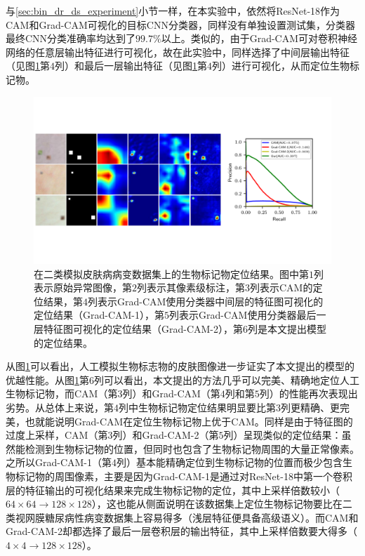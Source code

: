 与\ref{sec:bin_dr_ds_experiment}小节一样，在本实验中，依然将ResNet-18作为CAM和Grad-CAM可视化的目标CNN分类器，同样没有单独设置测试集，分类器最终CNN分类准确率均达到了$99.7\%$以上。类似的，由于Grad-CAM可对卷积神经网络的任意层输出特征进行可视化，故在此实验中，同样选择了中间层输出特征（见图\ref{fig:simulated_skin}第$4$列）和最后一层输出特征（见图\ref{fig:simulated_skin}第$4$列）进行可视化，从而定位生物标记物。
\begin{figure}[h]
	\centering
	\includegraphics[width=1.0\textwidth]{figure/pr_curve_skin_image.pdf}
	\caption{在二类模拟皮肤病病变数据集上的生物标记物定位结果。图中第$1$列表示原始异常图像，第$2$列表示其像素级标注，第$3$列表示CAM的定位结果，第$4$列表示Grad-CAM使用分类器中间层的特征图可视化的定位结果（Grad-CAM-1），第$5$列表示Grad-CAM使用分类器最后一层特征图可视化的定位结果（Grad-CAM-2），第$6$列是本文提出模型的定位结果。} 
	\label{fig:simulated_skin}
\end{figure}

\noindent 从图\ref{fig:simulated_skin}可以看出，人工模拟生物标志物的皮肤图像进一步证实了本文提出的模型的优越性能。从图\ref{fig:simulated_skin}第$6$列可以看出，本文提出的方法几乎可以完美、精确地定位人工生物标记物，而CAM（第$3$列）和Grad-CAM（第$4$列和第$5$列）的性能再次表现出劣势。从总体上来说，第$4$列中生物标记物定位结果明显要比第$3$列更精确、更完美，也就能说明Grad-CAM在定位生物标记物上优于CAM。同样是由于特征图的过度上采样，CAM（第$3$列）和Grad-CAM-2（第$5$列）呈现类似的定位结果：虽然能检测到生物标记物的位置，但同时也包含了生物标记物周围的大量正常像素。之所以Grad-CAM-1（第$4$列）基本能精确定位到生物标记物的位置而极少包含生物标记物的周围像素，主要是因为Grad-CAM-1是通过对ResNet-18中第一个卷积层的特征输出的可视化结果来完成生物标记物的定位，其中上采样倍数较小（$64\times 64\rightarrow 128\times 128$），这也能从侧面说明在该数据集上定位生物标记物要比在二类视网膜糖尿病性病变数据集上容易得多（浅层特征便具备高级语义）。而CAM和Grad-CAM-2却都选择了最后一层卷积层的输出特征，其中上采样倍数要大得多（$4\times4\rightarrow 128\times 128$）。

